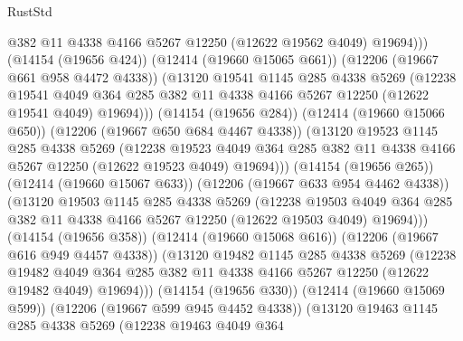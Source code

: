 \begin{lexlean}{RustStd}
\begin{coremodule}
{\begin{coremodule}
{{{{{{{{{{{{{{{{{{{{{{{{{{{{{{{{{{{{{{{{{{{{{{{{{{                    @382
                    @11
                    @4338
                    @4166
                    @5267
                    @12250
                    (@12622 @19562 @4049)
                    @19694)))
              (@14154 (@19656 @424))
              (@12414 (@19660 @15065 @661))
              (@12206 (@19667 @661 @958 @4472 @4338))
              (@13120
                @19541
                @1145
                @285
                @4338
                @5269
                (@12238
                  @19541
                  @4049
                  @364
                  @285
                  @382
                  @11
                  @4338
                  @4166
                  @5267
                  @12250
                  (@12622 @19541 @4049)
                  @19694)))
            (@14154 (@19656 @284))
            (@12414 (@19660 @15066 @650))
            (@12206 (@19667 @650 @684 @4467 @4338))
            (@13120
              @19523
              @1145
              @285
              @4338
              @5269
              (@12238
                @19523
                @4049
                @364
                @285
                @382
                @11
                @4338
                @4166
                @5267
                @12250
                (@12622 @19523 @4049)
                @19694)))
          (@14154 (@19656 @265))
          (@12414 (@19660 @15067 @633))
          (@12206 (@19667 @633 @954 @4462 @4338))
          (@13120
            @19503
            @1145
            @285
            @4338
            @5269
            (@12238
              @19503
              @4049
              @364
              @285
              @382
              @11
              @4338
              @4166
              @5267
              @12250
              (@12622 @19503 @4049)
              @19694)))
        (@14154 (@19656 @358))
        (@12414 (@19660 @15068 @616))
        (@12206 (@19667 @616 @949 @4457 @4338))
        (@13120
          @19482
          @1145
          @285
          @4338
          @5269
          (@12238
            @19482
            @4049
            @364
            @285
            @382
            @11
            @4338
            @4166
            @5267
            @12250
            (@12622 @19482 @4049)
            @19694)))
      (@14154 (@19656 @330))
      (@12414 (@19660 @15069 @599))
      (@12206 (@19667 @599 @945 @4452 @4338))
      (@13120
        @19463
        @1145
        @285
        @4338
        @5269
        (@12238
          @19463
          @4049
          @364
}}}}}}}}}}}}}}}}}}}}}}}}}}}}}}}}}}}}}}}}}}}}}}}}}}
\end{coremodule}}
\end{coremodule}
\end{lexlean}
